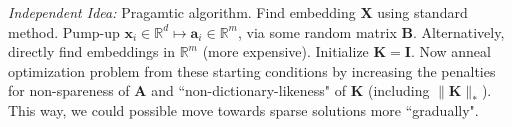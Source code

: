 \documentclass{article}
\renewcommand{\Re}{{\mathbb R}}
\newcommand{\x}{{\mathbf x}}
\newcommand{\valpha}{{\boldsymbol a}}
\newcommand{\mK}{{\mathbf K}}
\newcommand{\mA}{{\mathbf A}}
\newcommand{\mB}{{\mathbf B}}
\newcommand{\mX}{{\mathbf X}}
\begin{document}
\textit{Independent Idea:} Pragamtic algorithm. Find embedding $\mX$ using standard method. Pump-up $\x_i \in \Re^d \mapsto \valpha_i \in \Re^m$, via some random matrix $\mB$. Alternatively, directly find embeddings in $\Re^m$ (more expensive). Initialize $\mK = \mathbf I$. Now anneal optimization problem from these starting conditions by increasing the penalties for non-spareness of $\mA$ and ``non-dictionary-likeness" of $\mK$ (including $\| \mK \|_*$). This way, we could possible move towards sparse solutions more ``gradually".






\end{document}
